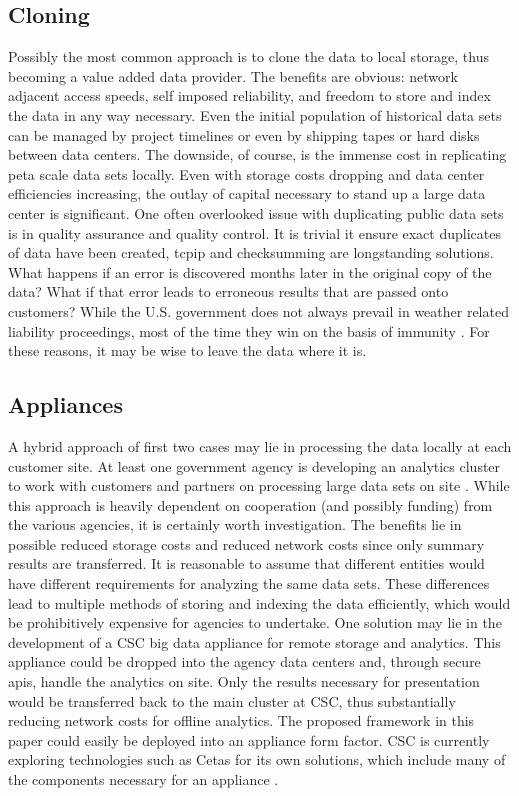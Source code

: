 \subsection{Cloning}
Possibly the most common approach is to clone the data to local storage, thus becoming a value added data provider. The benefits are obvious: network adjacent access speeds, self imposed reliability, and freedom to store and index the data in any way necessary. Even the initial population of historical data sets can be managed by project timelines or even by shipping tapes or hard disks between data centers. The downside, of course, is the immense cost in replicating peta scale data sets locally. Even with storage costs dropping and data center efficiencies increasing, the outlay of capital necessary to stand up a large data center is significant. One often overlooked issue with duplicating public data sets is in quality assurance and quality control. It is trivial it ensure exact duplicates of data have been created, \gls{tcpip} and checksumming are longstanding solutions. What happens if an error is discovered months later in the original copy of the data? What if that error leads to erroneous results that are passed onto customers?  While the U.S. government does not always prevail in weather related liability proceedings, most of the time they win on the basis of immunity \cite[Chapter~4]{fairweather}. For these reasons, it may be wise to leave the data where it is.
\subsection{Appliances}
A hybrid approach of first two cases may lie in processing the data locally at each customer site. At least one government agency is developing an analytics cluster to work with customers and partners on processing large data sets on site \cite{duffy}. While this approach is heavily dependent on cooperation (and possibly funding) from the various agencies, it is certainly worth investigation. The benefits lie in possible reduced storage costs and reduced network costs since only summary results are transferred. It is reasonable to assume that different entities would have different requirements for analyzing the same data sets. These differences lead to multiple methods of storing and indexing the data efficiently, which would be prohibitively expensive for agencies to undertake.  One solution may lie in the development of a \textsc{CSC} big data appliance for remote storage and analytics. This appliance could be dropped into the agency data centers and, through secure \gls{api}s, handle the analytics on site. Only the results necessary for presentation would be transferred back to the main cluster at \textsc{CSC}, thus substantially reducing network costs for offline analytics. The proposed framework in this paper could easily be deployed into an appliance form factor. \textsc{CSC} is currently exploring technologies such as Cetas for its own solutions,  which include many of the components necessary for an appliance \cite{cetas}.\\

